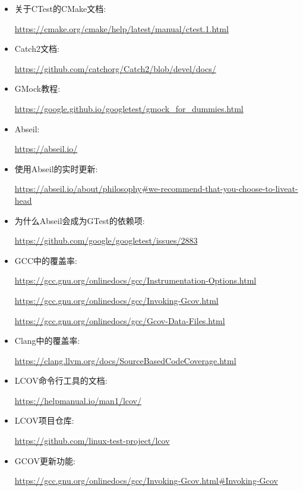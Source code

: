 

\begin{itemize}
\item
关于CTest的CMake文档:

\url{https://cmake.org/cmake/help/latest/manual/ctest.1.html}

\item
Catch2文档:

\url{https://github.com/catchorg/Catch2/blob/devel/docs/}

\item
GMock教程:

\url{https://google.github.io/googletest/gmock_for_dummies.html}

\item
Abseil:

\url{https://abseil.io/}

\item
使用Abseil的实时更新:

\url{https://abseil.io/about/philosophy#we-recommend-that-you-choose-to-liveat-head}

\item
为什么Abseil会成为GTest的依赖项:

\url{https://github.com/google/googletest/issues/2883}

\item
GCC中的覆盖率:

\url{https://gcc.gnu.org/onlinedocs/gcc/Instrumentation-Options.html}

\url{https://gcc.gnu.org/onlinedocs/gcc/Invoking-Gcov.html}

\url{https://gcc.gnu.org/onlinedocs/gcc/Gcov-Data-Files.html}

\item
Clang中的覆盖率:

\url{https://clang.llvm.org/docs/SourceBasedCodeCoverage.html}

\item
LCOV命令行工具的文档:

\url{https://helpmanual.io/man1/lcov/}

\item
LCOV项目仓库:

\url{https://github.com/linux-test-project/lcov}

\item
GCOV更新功能:

\url{https://gcc.gnu.org/onlinedocs/gcc/Invoking-Gcov.html#Invoking-Gcov}
\end{itemize}













